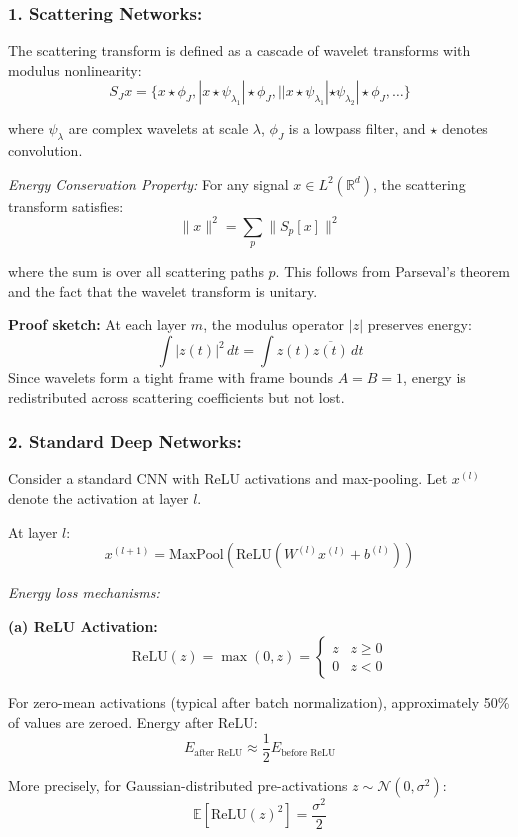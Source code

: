 \documentclass[12pt]{article}
\begin{document}
\subsubsection*{1. Scattering Networks:}

The scattering transform is defined as a cascade of wavelet transforms with modulus nonlinearity:
$$
S_J x = \{x \star \phi_J, |x \star \psi_{\lambda_1}| \star \phi_J, ||x \star \psi_{\lambda_1}| \star \psi_{\lambda_2}| \star \phi_J, \ldots\}
$$

where $\psi_{\lambda}$ are complex wavelets at scale $\lambda$, $\phi_J$ is a lowpass filter, and $\star$ denotes convolution.

\textit{Energy Conservation Property:} For any signal $x \in L^2(\mathbb{R}^d)$, the scattering transform satisfies:
$$
\|x\|^2 = \sum_{p} \|S_p[x]\|^2
$$

where the sum is over all scattering paths $p$. This follows from Parseval's theorem and the fact that the wavelet transform is unitary.

\textbf{Proof sketch:} At each layer $m$, the modulus operator $|z|$ preserves energy:
$$
\int |z(t)|^2 \, dt = \int z(t) \overline{z(t)} \, dt
$$
Since wavelets form a tight frame with frame bounds $A = B = 1$, energy is redistributed across scattering coefficients but not lost.

\subsubsection*{2. Standard Deep Networks:}

Consider a standard CNN with ReLU activations and max-pooling. Let $x^{(l)}$ denote the activation at layer $l$.

At layer $l$:
$$
x^{(l+1)} = \text{MaxPool}(\text{ReLU}(W^{(l)} x^{(l)} + b^{(l)}))
$$

\textit{Energy loss mechanisms:}

\textbf{(a) ReLU Activation:}
$$
\text{ReLU}(z) = \max(0, z) = \begin{cases} z & z \geq 0 \\ 0 & z < 0 \end{cases}
$$

For zero-mean activations (typical after batch normalization), approximately 50\% of values are zeroed. Energy after ReLU:
$$
E_{\text{after ReLU}} \approx \frac{1}{2} E_{\text{before ReLU}}
$$

More precisely, for Gaussian-distributed pre-activations $z \sim \mathcal{N}(0, \sigma^2)$:
$$
\mathbb{E}[\text{ReLU}(z)^2] = \frac{\sigma^2}{2}
$$
\end{document}

